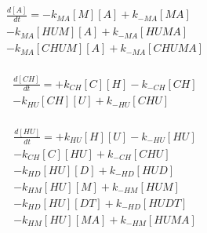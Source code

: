 \begin{equation}
\begin{split}
\frac{d[A]}{dt} =     - k_{MA}[M][A]    + k_{-MA}[MA]     \\%
                      - k_{MA}[HUM][A]  + k_{-MA}[HUMA]   \\%
                      - k_{MA}[CHUM][A] + k_{-MA}[CHUMA]  \\%
\end{split}
\end{equation}

\begin{equation}
\begin{split}
\frac{d[CH]}{dt} =    + k_{CH}[C][H]    - k_{-CH}[CH]     \\%
                      - k_{HU}[CH][U]   + k_{-HU}[CHU]    \\%
\end{split}
\end{equation}

\begin{equation}
\begin{split}
\frac{d[HU]}{dt} =    + k_{HU}[H][U]    - k_{-HU}[HU]     \\%
                      - k_{CH}[C][HU]   + k_{-CH}[CHU]    \\%
                      - k_{HD}[HU][D]   + k_{-HD}[HUD]    \\%
                      - k_{HM}[HU][M]   + k_{-HM}[HUM]    \\%
                      - k_{HD}[HU][DT]  + k_{-HD}[HUDT]   \\%
                      - k_{HM}[HU][MA]  + k_{-HM}[HUMA]   \\%
\end{split}
\end{equation}

